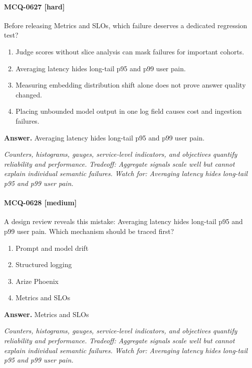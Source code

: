\paragraph{MCQ-0627 [hard]} Before releasing Metrics and SLOs, which failure deserves a dedicated regression test?
\begin{enumerate}[label=\Alph*.]
\item Judge scores without slice analysis can mask failures for important cohorts.
\item Averaging latency hides long-tail p95 and p99 user pain.
\item Measuring embedding distribution shift alone does not prove answer quality changed.
\item Placing unbounded model output in one log field causes cost and ingestion failures.
\end{enumerate}
\noindent\textbf{Answer.} Averaging latency hides long-tail p95 and p99 user pain.
\par\textit{Counters, histograms, gauges, service-level indicators, and objectives quantify reliability and performance. Tradeoff: Aggregate signals scale well but cannot explain individual semantic failures. Watch for: Averaging latency hides long-tail p95 and p99 user pain.}
\paragraph{MCQ-0628 [medium]} A design review reveals this mistake: Averaging latency hides long-tail p95 and p99 user pain. Which mechanism should be traced first?
\begin{enumerate}[label=\Alph*.]
\item Prompt and model drift
\item Structured logging
\item Arize Phoenix
\item Metrics and SLOs
\end{enumerate}
\noindent\textbf{Answer.} Metrics and SLOs
\par\textit{Counters, histograms, gauges, service-level indicators, and objectives quantify reliability and performance. Tradeoff: Aggregate signals scale well but cannot explain individual semantic failures. Watch for: Averaging latency hides long-tail p95 and p99 user pain.}
